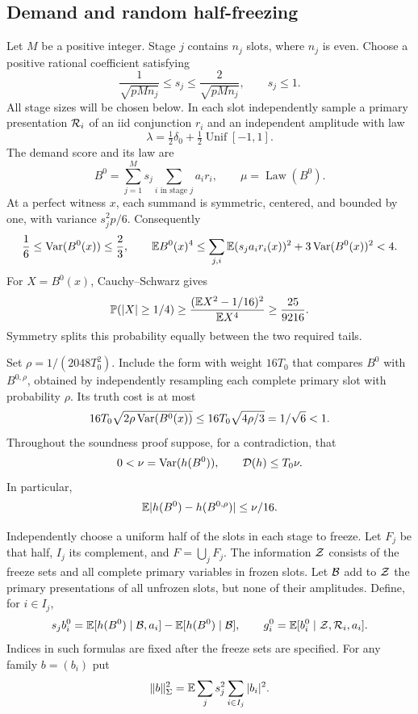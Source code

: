 \subsection{Demand and random half-freezing}

Let $M$ be a positive integer. Stage $j$ contains $n_j$ slots, where
$n_j$ is even. Choose a positive rational coefficient satisfying
\begin{equation}\label{eq:score-scales}
 \frac1{\sqrt{pMn_j}}\le s_j\le\frac2{\sqrt{pMn_j}},\qquad s_j\le1.
\end{equation}
All stage sizes will be chosen below. In each slot independently sample
a primary presentation $\mathcal R_i$ of an iid conjunction $r_i$ and an
independent amplitude with law
\[
 \lambda=\tfrac12\delta_0+\tfrac12\operatorname{Unif}[-1,1].
\]
The demand score and its law are
\[
 B^0=\sum_{j=1}^M s_j\sum_{i\text{ in stage }j}a_i r_i,
 \qquad \mu=\operatorname{Law}(B^0).
\]
At a perfect witness $x$, each summand is symmetric, centered, and bounded
by one, with variance $s_j^2p/6$. Consequently
\[
 \frac16\le\operatorname{Var}(B^0(x))\le\frac23,\qquad
 \mathbb E B^0(x)^4
 \le\sum_{j,i}\mathbb E(s_ja_ir_i(x))^2+3\operatorname{Var}(B^0(x))^2<4.
\]
For $X=B^0(x)$, Cauchy--Schwarz gives
\[
 \mathbb P(|X|\ge1/4)
 \ge\frac{(\mathbb E X^2-1/16)^2}{\mathbb E X^4}
 \ge\frac{25}{9216}.
\]
Symmetry splits this probability equally between the two required tails.

Set $\rho=1/(2048T_0^2)$. Include the form with weight $16T_0$ that
compares $B^0$ with $B^{0,\rho}$, obtained by independently resampling
each complete primary slot with probability $\rho$. Its truth cost is
at most
\[
 16T_0\sqrt{2\rho\operatorname{Var}(B^0(x))}
 \le16T_0\sqrt{4\rho/3}=1/\sqrt6<1.
\]
Throughout the soundness proof suppose, for a contradiction, that
\begin{equation}\label{eq:assumed-score-cut}
 0<\nu=\operatorname{Var}(h(B^0)),\qquad \mathcal D(h)\le T_0\nu.
\end{equation}
In particular,
\begin{equation}\label{eq:resampling-bound}
 \mathbb E|h(B^0)-h(B^{0,\rho})|\le\nu/16.
\end{equation}

Independently choose a uniform half of the slots in each stage to freeze.
Let $F_j$ be that half, $I_j$ its complement, and $F=\bigcup_jF_j$.
The information $\mathcal Z$ consists of the freeze sets and all complete
primary variables in frozen slots. Let $\mathcal B$ add to $\mathcal Z$ the primary
presentations of all unfrozen slots, but none of their amplitudes. Define,
for $i\in I_j$,
\[
 s_jb_i^0=\mathbb E[h(B^0)\mid\mathcal B,a_i]-\mathbb E[h(B^0)\mid\mathcal B],
 \qquad g_i^0=\mathbb E[b_i^0\mid\mathcal Z,\mathcal R_i,a_i].
\]
Indices in such formulas are fixed after the freeze sets are specified.
For any family $b=(b_i)$ put
\[
 \|b\|_\Sigma^2=\mathbb E\sum_j s_j^2\sum_{i\in I_j}|b_i|^2.
\]

